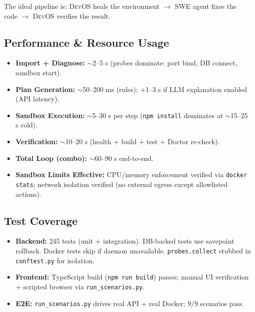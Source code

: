 \documentclass[conference,10pt,caption=false]{IEEEtran}
\newcommand{\devos}{\textsc{DevOS}\xspace}
\begin{document}
The ideal pipeline is: \devos heals the environment $\to$ SWE agent fixes the code $\to$ \devos verifies the result.

\subsection{Performance \& Resource Usage}
\begin{itemize}[leftmargin=*, nosep]
    \item \textbf{Import + Diagnose:} $\sim$2--5 s (probes dominate: port bind, DB connect, sandbox start).
    \item \textbf{Plan Generation:} $\sim$50--200 ms (rules); +1--3 s if LLM explanation enabled (API latency).
    \item \textbf{Sandbox Execution:} $\sim$5--30 s per step (\texttt{npm install} dominates at $\sim$15--25 s cold).
    \item \textbf{Verification:} $\sim$10--20 s (health + build + test + Doctor re-check).
    \item \textbf{Total Loop (combo):} $\sim$60--90 s end-to-end.
    \item \textbf{Sandbox Limits Effective:} CPU/memory enforcement verified via \texttt{docker stats}; network isolation verified (no external egress except allowlisted actions).
\end{itemize}

\subsection{Test Coverage}
\begin{itemize}[leftmargin=*, nosep]
    \item \textbf{Backend:} 245 tests (unit + integration). DB-backed tests use savepoint rollback. Docker tests skip if daemon unavailable. \texttt{probes.collect} stubbed in \texttt{conftest.py} for isolation.
    \item \textbf{Frontend:} TypeScript build (\texttt{npm run build}) passes; manual UI verification + scripted browser via \texttt{run\_scenarios.py}.
    \item \textbf{E2E:} \texttt{run\_scenarios.py} drives real API + real Docker; 9/9 scenarios pass.
\end{itemize}
\end{document}
